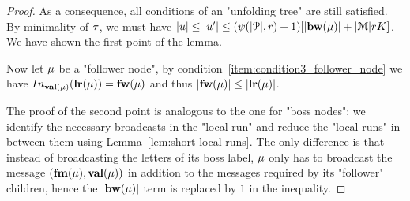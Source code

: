 \begin{proof}
	As a consequence, all conditions of an "unfolding tree" are still satisfied. 
	By minimality of $\tau$, we must have $\size{u} \leq \size{u'} \leq (\towerfun(\size{\prot}, r) +1) \Large[\size{\bosslabel{\node}}+ \size{\messages}rK\Large]$. We have shown the first point of the lemma.
	
	Now let $\mu$ be a "follower node", by condition~\ref{item:condition3_follower_node} we have $\vinput{\valuelabel{\node}}{\localrunlabel{\node}} = \followlabelword{\node}$ and thus $|\mathbf{fw}(\mu)| \leq |\mathbf{lr}(\mu)|$.
	
	The proof of the second point is analogous to the one for "boss nodes": we identify the necessary broadcasts in the "local run" and reduce the "local runs" in-between them using Lemma~\ref{lem:short-local-runs}. The only difference is that instead of broadcasting the letters of its boss label, $\mu$ only has to broadcast the message $(\mathbf{fm}(\mu), \mathbf{val}(\mu))$ in addition to the messages required by its "follower" children, hence the $|\mathbf{bw}(\mu)|$ term is replaced by $1$ in the inequality.
\end{proof}

